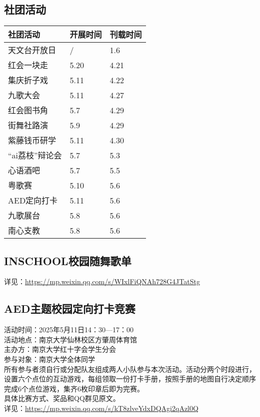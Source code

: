 \documentclass[letterpaper, 12pt]{article}
\begin{document}
\begin{multicols}{2}
\section{社团活动}
\begin{tabular}{|>{\centering\arraybackslash}m{}|m{}|m{}|}
    \hline
    社团活动 & 开展时间 & 刊载时间\\
    \hline\hline
    天文台开放日 & / & 1.6\\
    红会一块走 & 5.20 & 4.21\\
    集庆折子戏 & 5.11 & 4.22\\
    九歌大会 & 5.11 & 4.27\\
    红会图书角 & 5.7 & 4.29\\
    街舞社路演 & 5.9 & 4.29\\
    紫藤钱币研学 & 5.11 & 4.30\\
    “ai荔枝”辩论会 & 5.7 & 5.3\\
    心语酒吧 & 5.7 & 5.5\\
    粤歌赛 & 5.10 & 5.6\\
    AED定向打卡 & 5.11 & 5.6\\
    九歌展台 & 5.8 & 5.6\\
    南心支教 & 5.8 & 5.6\\
    \hline
\end{tabular}

\subsection{INSCHOOL校园随舞歌单} %
详见：\url{https://mp.weixin.qq.com/s/WIxlFiQNAh728G4JTatStg}
\subsection{AED主题校园定向打卡竞赛} %
活动时间：2025年5月11日14：30—17：00
\\活动地点：南京大学仙林校区方肇周体育馆
\\主办方：南京大学红十字会学生分会
\\参与对象：南京大学全体同学
\\所有参与者须自行或分配队友组成两人小队参与本次活动。活动分两个时段进行，设置六个点位的互动游戏，每组领取一份打卡手册，按照手册的地图自行决定顺序完成6个点位游戏，集齐6枚印章后即为完赛。
\\具体比赛方式、奖品和QQ群见原文。
\\详见：\url{https://mp.weixin.qq.com/s/kT8zlveYdxDQAgi2qAzl0Q}


\end{multicols}
\end{document}
